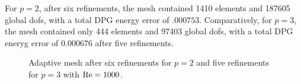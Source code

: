 For $p=2$, after six refinements, the mesh contained 1410 elements and 187605 global dofs, with a total DPG energy error of $.000753$. Comparatively, for $p=3$, the mesh contained only 444 elements and 97403 global dofs, with a total DPG eneryg error of $0.000676$ after five refinements. 

\begin{figure}[!h]
\centering
{}
\caption{Adaptive mesh after six refinements for $p=2$ and five refinements for $p=3$ with $\Reyn = 1000$.}
\label{fig:MeshRe500}
\end{figure}
